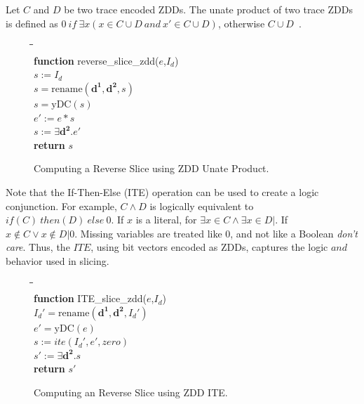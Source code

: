 \documentclass[defaultstyle,11pt]{thesis}
\begin{document}
Let $C$ and $D$ be two trace encoded ZDDs.  The unate product of two
trace ZDDs is defined as $0 \ if \ \exists x(x \in C \cup D \ and \ x' \in
C \cup D)$, otherwise $C \cup D$~\cite{hachtel:00:kap}.

\begin{figure}
\begin{center}
\begin{minipage}{1.5in}
\begin{tabbing}
\hspace{1em}\=\hspace{1em}\=\hspace{1em}\=\hspace{1em}\=\\
\textbf{function} reverse\_slice\_zdd($e$,$I_d$)\\
\>$s := I_d$\\
\>$s = \mathrm{rename}(\mathbf{d^1},\mathbf{d^2},s)$\\
\>$s = \mathrm{yDC}(s)$\\
\>$e' := e * s$\\
\>$s := \exists \mathbf{d^2}.e'$\\
\>\textbf{return} $s$
\end{tabbing}
\end{minipage}
\end{center}
\caption{Computing a Reverse Slice using ZDD Unate Product.}
\label{fig:zddUPslice}
\end{figure}

Note that the If-Then-Else (ITE) operation can be used to create a
logic conjunction.  For example, $C \wedge D$ is logically equivalent
to $if(C) \ then(D) \ else \ 0$.  If $x$ is a literal, for $\exists x
\in C \wedge \exists x \in D | $.  If $x \not \in C \vee x \not \in
D|0$.  Missing variables are treated like $0$, and not like a Boolean
\textit{don't care}.  Thus, the $ITE$, using bit vectors encoded as
ZDDs, captures the logic $and$ behavior used in slicing.

\begin{figure}
\begin{center}
\begin{minipage}{1.5in}
\begin{tabbing}
\hspace{1em}\=\hspace{1em}\=\hspace{1em}\=\hspace{1em}\=\\
\textbf{function} ITE\_slice\_zdd($e$,$I_d$)\\
\>$I_d' = \mathrm{rename}(\mathbf{d^1},\mathbf{d^2},I_d')$\\
\>$e' = \mathrm{yDC}(e)$\\
\>$s := ite(I_d',e',zero)$\\
\>$s' := \exists \mathbf{d^2}.s$\\
\>\textbf{return} $s'$
\end{tabbing}
\end{minipage}
\end{center}
\caption{Computing an Reverse Slice using ZDD ITE.}
\label{fig:zddITEslice}
\end{figure}
\end{document}

